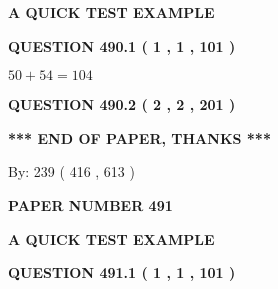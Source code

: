 \documentclass[12pt]{article}
\begin{document}
   
\vspace{0.2in}
   
   
   
   
   
   
 \vspace{0.2in}
{\LARGE {\textbf{ A QUICK TEST EXAMPLE}}}
   
   
  
\vspace{0.2in}
  
{\textbf{\Large{QUESTION
490.1 
 ( 1 , 1 , 101 )
}}}
  
  
 
 

$ %
50 +  %
54=   %
104$
 
 
  
\vspace{0.2in}
  
{\textbf{\Large{QUESTION
490.2 
 ( 2 , 2 , 201 )
}}}
  
  
   
   
 \vspace{0.2in}
 
   
   
   
   
\vspace{1.0in} 
{\textbf{\large{ *** END OF PAPER, THANKS *** }}} 
   
   
\hspace{1.0in} By: 
 239 ( 416 ,  613 )
   
   
   
   
\newpage 
\setcounter{page}{ 
   491001 } 
   
   
   
   
 {\textbf{ \Large{ PAPER NUMBER  491  }}}
   
   
\vspace{0.2in}
   
   
   
   
   
   
 \vspace{0.2in}
{\LARGE {\textbf{ A QUICK TEST EXAMPLE}}}
   
   
  
\vspace{0.2in}
  
{\textbf{\Large{QUESTION
491.1 
 ( 1 , 1 , 101 )
}}}
  
\end{document}
